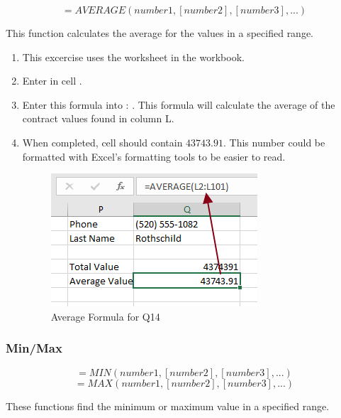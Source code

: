 \[ =AVERAGE(number1, [number2], [number3], ...) \]

This function calculates the average for the values in a specified range. 

\begin{enumerate}
	\item This excercise uses the  worksheet in the  workbook.
	\item Enter  in cell .
	\item Enter this formula into : . This formula will calculate the average of the contract values found in column L.
	\item When completed, cell  should contain $ 43743.91 $. This number could be formatted with Excel's formatting tools to be easier to read.

	\begin{figure}[H]
		\centering
		\includegraphics[width=\maxwidth{.95\linewidth}]{gfx/ch09_fig39}
		\caption{Average Formula for Q14}
		\label{09:fig39}
	\end{figure}

\end{enumerate}

\subsubsection{Min/Max}

\[ =MIN(number1, [number2], [number3], ...) \]
\[ =MAX(number1, [number2], [number3], ...) \]

These functions find the minimum or maximum value in a specified range. 

